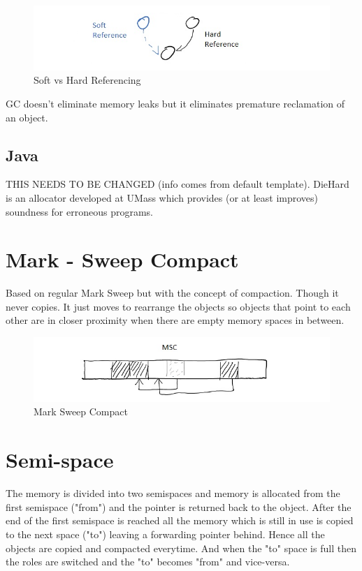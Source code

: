 \documentclass[twoside]{article}
\begin{document}
\begin{figure}[ht!]
\center
\includegraphics[width=150mm]{Soft_vs_Hard.jpg}
\caption{Soft vs Hard Referencing \label{softVsHard}}
\end{figure}

GC doesn't eliminate memory leaks but it eliminates premature reclamation of an object. 

\subsection{Java}

THIS NEEDS TO BE CHANGED (info comes from default template). DieHard is an allocator developed at UMass which provides (or at least
improves) soundness for erroneous programs.


\section{Mark - Sweep Compact}

Based on regular Mark Sweep but with the concept of compaction. Though it never copies. It just moves to rearrange the objects so objects that point to each other are in closer proximity when there are empty memory spaces in between.

\begin{figure}[ht!]
\center
\includegraphics[width=150mm]{MSC.jpg}
\caption{ Mark Sweep Compact \label{markSweepCompact}}
\end{figure}

\section{Semi-space}

The memory is divided into two semispaces and memory is  allocated from the first semispace ("from") and the pointer is returned back to the object. After the end of the first semispace is reached all the memory which is still in use is copied to the next space ("to") leaving a forwarding pointer behind. Hence all the objects are copied and compacted everytime. And when the "to" space is full then the roles are switched and the "to" becomes "from" and vice-versa.
\end{document}
